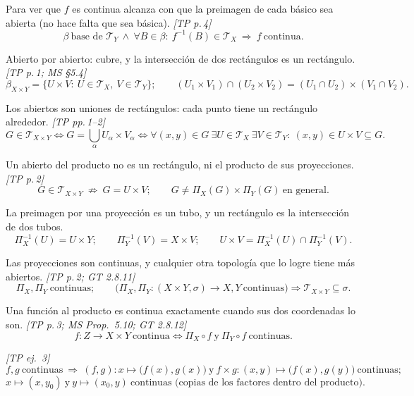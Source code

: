 \documentclass[11pt,a4paper]{article}
\theoremstyle{definition}
\theoremstyle{plain}
\newcommand{\fnt}[1]{{\normalfont\small\itshape\color{gray!150!black}[#1]}}
\newcommand{\tp}{\mathcal{T}}
\begin{document}
\begin{itemize}[leftmargin=1.3em,itemsep=3pt]

 Para ver que $f$ es continua alcanza con que la preimagen de cada básico sea abierta (no hace falta que sea básica). \fnt{TP p.\,4}
\[ \beta\ \text{base de }\tp_Y\ \wedge\ \forall B\in\beta:\ f^{-1}(B)\in\tp_X\ \Rightarrow\ f\ \text{continua}. \]

 Abierto por abierto: cubre, y la intersección de dos rectángulos es un rectángulo. \fnt{TP p.\,1; MS \S5.4}
\[ \beta_{X\times Y}=\{U\times V:\ U\in\tp_X,\ V\in\tp_Y\};\qquad (U_1\times V_1)\cap(U_2\times V_2)=(U_1\cap U_2)\times(V_1\cap V_2). \]

 Los abiertos son uniones de rectángulos: cada punto tiene un rectángulo alrededor. \fnt{TP pp.\,1--2}
\[ G\in\tp_{X\times Y}\iff G=\bigcup_{\alpha}U_\alpha\times V_\alpha\iff \forall (x,y)\in G\ \exists U\in\tp_X\ \exists V\in\tp_Y:\ (x,y)\in U\times V\subseteq G. \]

 Un abierto del producto no es un rectángulo, ni el producto de sus proyecciones. \fnt{TP p.\,2}
\[ G\in\tp_{X\times Y}\ \not\Rightarrow\ G=U\times V;\qquad G\ne\Pi_X(G)\times\Pi_Y(G)\ \text{en general}. \]

 La preimagen por una proyección es un tubo, y un rectángulo es la intersección de dos tubos.
\[ \Pi_X^{-1}(U)=U\times Y;\qquad \Pi_Y^{-1}(V)=X\times V;\qquad U\times V=\Pi_X^{-1}(U)\cap\Pi_Y^{-1}(V). \]

 Las proyecciones son continuas, y cualquier otra topología que lo logre tiene más abiertos. \fnt{TP p.\,2; GT 2.8.11}
\[ \Pi_X,\Pi_Y\ \text{continuas};\qquad \big(\Pi_X,\Pi_Y:(X\times Y,\sigma)\to X,Y\ \text{continuas}\big)\Rightarrow \tp_{X\times Y}\subseteq\sigma. \]

 Una función al producto es continua exactamente cuando sus dos coordenadas lo son. \fnt{TP p.\,3; MS Prop.\ 5.10; GT 2.8.12}
\[ f:Z\to X\times Y\ \text{continua}\iff \Pi_X\circ f\ \text{y}\ \Pi_Y\circ f\ \text{continuas}. \]

 \fnt{TP ej.\ 3}
\[ f,g\ \text{continuas}\ \Rightarrow\ (f,g):x\mapsto\big(f(x),g(x)\big)\ \text{y}\ f\times g:(x,y)\mapsto\big(f(x),g(y)\big)\ \text{continuas}; \]
\[ x\mapsto(x,y_0)\ \text{y}\ y\mapsto(x_0,y)\ \text{continuas (copias de los factores dentro del producto)}. \]


\end{itemize}
\end{document}
